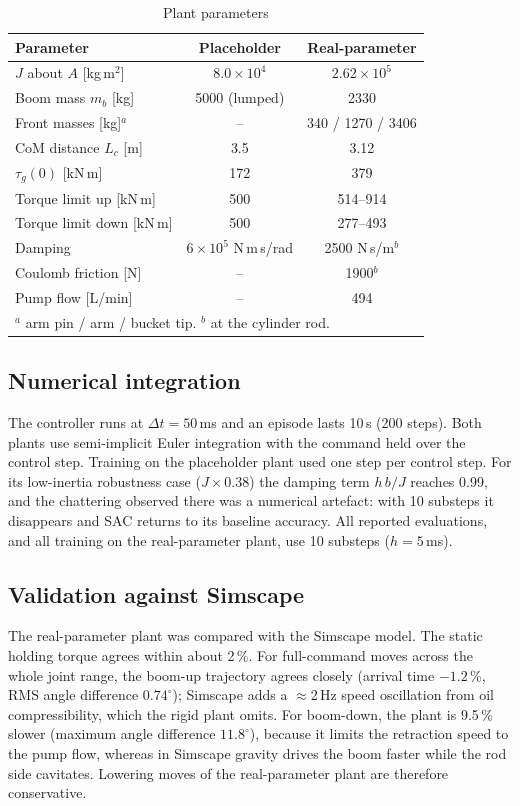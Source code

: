\begin{table}[t]
\caption{Plant parameters}
\label{tab:params}
\centering
\footnotesize
\setlength{\tabcolsep}{3pt}
\begin{tabular}{lcc}
\hline
Parameter & Placeholder & Real-parameter \\
\hline
$J$ about $A$ [kg\,m$^2$] & $8.0\times10^{4}$ & $2.62\times10^{5}$ \\
Boom mass $m_b$ [kg] & 5000 (lumped) & 2330 \\
Front masses [kg]$^{a}$ & -- & 340 / 1270 / 3406 \\
CoM distance $L_c$ [m] & 3.5 & 3.12 \\
$\tau_g(0)$ [kN\,m] & 172 & 379 \\
Torque limit up [kN\,m] & 500 & 514--914 \\
Torque limit down [kN\,m] & 500 & 277--493 \\
Damping & $6\times10^{5}$ N\,m\,s/rad & 2500 N\,s/m$^{b}$ \\
Coulomb friction [N] & -- & 1900$^{b}$ \\
Pump flow [L/min] & -- & 494 \\
\hline
\multicolumn{3}{l}{$^{a}$ arm pin / arm / bucket tip. $^{b}$ at the cylinder rod.}
\end{tabular}
\end{table}

\subsection{Numerical integration}
The controller runs at $\Delta t=50$\,ms and an episode lasts 10\,s (200 steps).
Both plants use semi-implicit Euler integration with the command held over the control step.
Training on the placeholder plant used one step per control step. For its low-inertia robustness case
($J\times0.38$) the damping term $h\,b/J$ reaches 0.99, and the chattering observed there was a
numerical artefact: with 10 substeps it disappears and SAC returns to its baseline accuracy.
All reported evaluations, and all training on the real-parameter plant, use 10 substeps ($h=5$\,ms).

\subsection{Validation against Simscape}
The real-parameter plant was compared with the Simscape model.
The static holding torque agrees within about 2\,\%.
For full-command moves across the whole joint range, the boom-up trajectory agrees
closely (arrival time $-1.2$\,\%, RMS angle difference $0.74^\circ$); Simscape adds a
$\approx$2\,Hz speed oscillation from oil compressibility, which the rigid plant omits.
For boom-down, the plant is 9.5\,\% slower (maximum angle difference $11.8^\circ$), because it
limits the retraction speed to the pump flow, whereas in Simscape gravity drives the boom
faster while the rod side cavitates. Lowering moves of the real-parameter plant are therefore
conservative.
